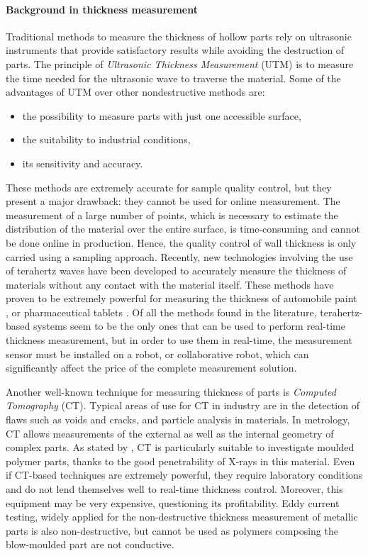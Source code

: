 \paragraph{Background in thickness measurement}

Traditional methods to measure the thickness of hollow parts rely on ultrasonic instruments that provide satisfactory results while avoiding the destruction of parts. The principle of \textit{Ultrasonic Thickness Measurement} (UTM) is to measure the time needed for the ultrasonic wave to traverse the material. Some of the advantages of UTM over other nondestructive methods are:
\begin{itemize}
    \item the possibility to measure parts with just one accessible surface,
    \item the suitability to industrial conditions,
    \item its sensitivity and accuracy.
\end{itemize}
 
These methods are extremely accurate for sample quality control, but they present a major drawback: they cannot be used for online measurement. The measurement of a large number of points, which is necessary to estimate the distribution of the material over the entire surface, is time-consuming and cannot be done online in production. Hence, the quality control of wall thickness is only carried using a sampling approach. Recently, new technologies involving the use of terahertz waves have been developed to accurately measure the thickness of materials without any contact with the material itself. These methods have proven to be extremely powerful for measuring the thickness of automobile paint \citep{su2014terahertz,krimi2016highly}, or pharmaceutical tablets \citep{may2011terahertz}. Of all the methods found in the literature, terahertz-based systems seem to be the only ones that can be used to perform real-time thickness measurement, but in order to use them in real-time, the measurement sensor must be installed on a robot, or collaborative robot, which can significantly affect the price of the complete measurement solution.

Another well-known technique for measuring thickness of parts is \textit{Computed Tomography} (CT). Typical areas of use for CT in industry are in the detection of flaws such as voids and cracks, and particle analysis in materials. In metrology, CT allows measurements of the external as well as the internal geometry of complex parts. As stated by \citet{de2014industrial}, CT is particularly suitable to investigate moulded polymer parts, thanks to the good penetrability of X-rays in this material. Even if CT-based techniques are extremely powerful, they require laboratory conditions and  do not lend themselves well to real-time thickness control. Moreover, this equipment may be very expensive, questioning its profitability.
%
Eddy current testing, widely applied for the non-destructive thickness measurement of metallic parts \citep{cheng2017thickness,mao2016thickness,wang2015noncontact,yin2007thickness}  is also non-destructive, but cannot be used as polymers composing the blow-moulded part are not conductive.

